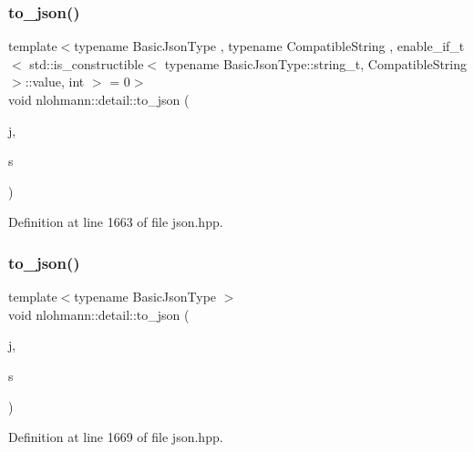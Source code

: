 \subsubsection{\texorpdfstring{to\+\_\+json()}{to\_json()}\hspace{0.1cm}{\footnotesize\ttfamily [2/16]}}
{\footnotesize\ttfamily template$<$typename Basic\+Json\+Type , typename Compatible\+String , enable\+\_\+if\+\_\+t$<$ std\+::is\+\_\+constructible$<$ typename Basic\+Json\+Type\+::string\+\_\+t, Compatible\+String $>$\+::value, int $>$  = 0$>$ \\
void nlohmann\+::detail\+::to\+\_\+json (\begin{DoxyParamCaption}\item[{Basic\+Json\+Type \&}]{j,  }\item[{const Compatible\+String \&}]{s }\end{DoxyParamCaption})}



Definition at line 1663 of file json.\+hpp.

\mbox{\label{namespacenlohmann_1_1detail_a4aa1ca6b7c61bf19d1f30ea5b669f68e}} 
\subsubsection{\texorpdfstring{to\+\_\+json()}{to\_json()}\hspace{0.1cm}{\footnotesize\ttfamily [3/16]}}
{\footnotesize\ttfamily template$<$typename Basic\+Json\+Type $>$ \\
void nlohmann\+::detail\+::to\+\_\+json (\begin{DoxyParamCaption}\item[{Basic\+Json\+Type \&}]{j,  }\item[{typename Basic\+Json\+Type\+::string\+\_\+t \&\&}]{s }\end{DoxyParamCaption})}



Definition at line 1669 of file json.\+hpp.

\mbox{\label{namespacenlohmann_1_1detail_a22bffdc8bc7e43af380ba2050696b230}} 
